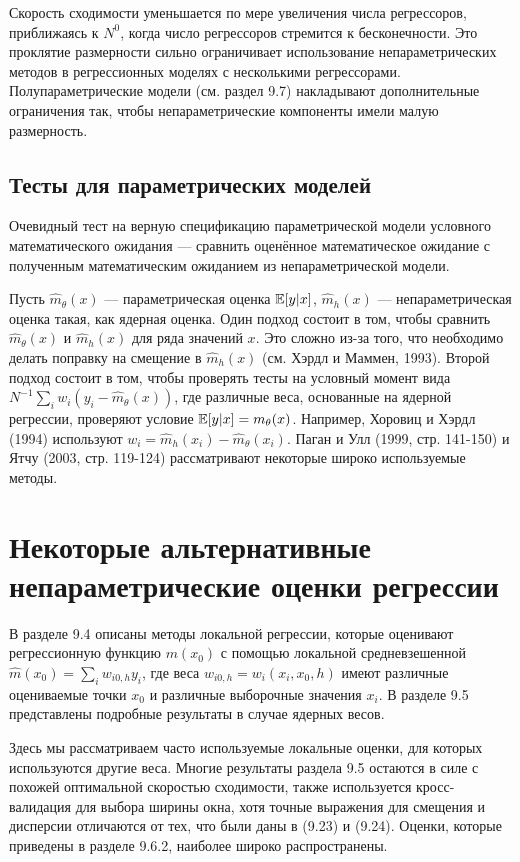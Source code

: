 Скорость сходимости уменьшается по мере увеличения числа регрессоров, приближаясь к $N^0$, когда число регрессоров стремится к бесконечности. Это проклятие размерности сильно ограничивает использование непараметрических методов в регрессионных моделях с несколькими регрессорами. Полупараметрические модели (см. раздел 9.7) накладывают дополнительные ограничения так, чтобы непараметрические компоненты имели малую размерность.

\subsection{Тесты для параметрических моделей} 

Очевидный тест на верную спецификацию параметрической модели условного математического ожидания --- сравнить оценённое математическое ожидание с полученным математическим ожиданием из непараметрической модели.

Пусть $\hat{m}_{\theta}(x)$ --- параметрическая оценка $\mathbb{E}[y|x]$, $\hat{m}_h(x)$ --- непараметрическая оценка такая, как  ядерная оценка. Один подход состоит в том, чтобы сравнить  $\hat{m}_{\theta}(x)$ и $\hat{m}_h(x)$ для ряда значений $x$. Это сложно из-за того, что необходимо делать поправку на смещение в $\hat{m}_h(x)$ (см. Хэрдл и Маммен, 1993). Второй подход состоит в том, чтобы проверять тесты на условный момент вида $N^{-1}\sum_i w_i(y_i - \hat{m}_{\theta}(x))$, где различные веса, основанные на ядерной регрессии, проверяют условие $\mathbb{E}[y|x] = m_{\theta}(x)$. Например, Хоровиц и Хэрдл (1994) используют $w_i = \hat{m}_h(x_i) - \hat{m}_{\theta}(x_i)$. Паган и Улл (1999, стр. 141-150) и Ятчу (2003, стр. 119-124) рассматривают некоторые широко используемые методы.

\section{Некоторые альтернативные непараметрические оценки регрессии}

В разделе 9.4 описаны методы локальной регрессии, которые оценивают регрессионную функцию $m(x_0)$ с помощью локальной средневзешенной $\hat{m}(x_0) = \sum_i w_{i0,h}y_i$, где веса $w_{i0,h} = w_i(x_i, x_0, h)$ имеют различные оцениваемые точки $x_0$ и различные выборочные значения $x_i$. В разделе 9.5 представлены подробные результаты в случае ядерных весов.

Здесь мы рассматриваем часто используемые локальные оценки, для которых используются другие веса. Многие результаты раздела 9.5 остаются в силе с похожей оптимальной скоростью сходимости, также используется кросс-валидация для выбора ширины окна, хотя точные выражения для смещения и дисперсии отличаются от тех, что были даны в (9.23) и (9.24). Оценки, которые приведены в разделе 9.6.2, наиболее широко распространены.


